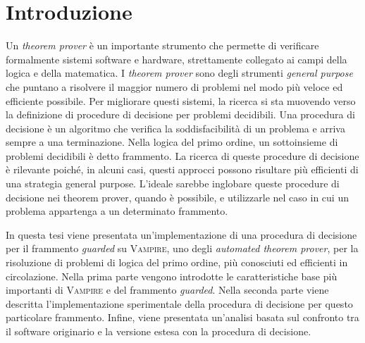 \pagestyle{introduction}
\chapter*{Introduzione}
Un \emph{theorem prover} è un importante strumento che permette di verificare formalmente 
sistemi software e hardware, strettamente collegato ai campi della logica e della matematica.
I \emph{theorem prover} sono degli strumenti \emph{general purpose} che puntano a risolvere il maggior numero di problemi nel modo più veloce 
ed efficiente possibile. Per migliorare questi sistemi, la ricerca si sta muovendo verso la definizione di 
procedure di decisione per problemi decidibili. Una procedura di decisione è un algoritmo che verifica 
la soddisfacibilità di un problema e arriva sempre a una terminazione. Nella logica del primo ordine, un sottoinsieme di problemi decidibili è detto 
frammento. La ricerca di queste procedure di decisione è rilevante poiché, in alcuni casi, questi approcci possono risultare 
più efficienti di una strategia general purpose. L'ideale sarebbe inglobare queste procedure di decisione nei 
theorem prover, quando è possibile, e utilizzarle nel caso in cui un problema appartenga a un determinato frammento.

In questa tesi viene presentata un'implementazione di una procedura di decisione per il frammento \emph{guarded} su   
\textsc{Vampire}, uno degli \emph{automated theorem prover}, per la risoluzione di 
problemi di logica del primo ordine, più conosciuti ed efficienti in circolazione. Nella prima parte vengono introdotte le caratteristiche base
più importanti di \textsc{Vampire} e del frammento \emph{guarded}. Nella seconda parte viene descritta 
l'implementazione sperimentale della procedura di decisione per questo particolare frammento. Infine, viene presentata un'analisi basata sul 
confronto tra il software originario e la versione estesa con la procedura di decisione. 
